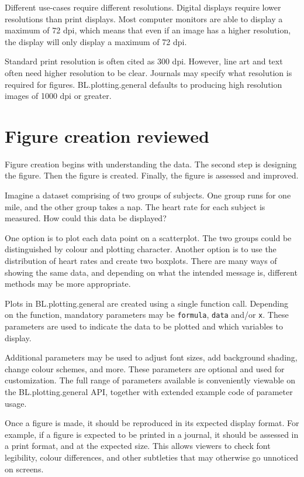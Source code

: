 \documentclass[letterpaper]{report}\usepackage[]{graphicx}\usepackage[]{color}
\begin{document}
Different use-cases require different resolutions. Digital displays require lower resolutions than print displays. Most computer monitors are able to display a maximum of 72 dpi, which means that even if an image has a higher resolution, the display will only display a maximum of 72 dpi. 

Standard print resolution is often cited as 300 dpi. However, line art and text often need higher resolution to be clear. Journals may specify what resolution is required for figures. BL.plotting.general defaults to producing high resolution images of 1000 dpi or greater.

\section{Figure creation reviewed}
Figure creation begins with understanding the data. The second step is designing the figure. Then the figure is created. Finally, the figure is assessed and improved.

Imagine a dataset comprising of two groups of subjects. One group runs for one mile, and the other group takes a nap. The heart rate for each subject is measured. How could this data be displayed? 

One option is to plot each data point on a scatterplot. The two groups could be distinguished by colour and plotting character. Another option is to use the distribution of heart rates and create two boxplots. There are many ways of showing the same data, and depending on what the intended message is, different methods may be more appropriate.

Plots in BL.plotting.general are created using a single function call. Depending on the function, mandatory parameters may be \verb|formula|, \verb|data| and/or \verb|x|. These parameters are used to indicate the data to be plotted and which variables to display.

Additional parameters may be used to adjust font sizes, add background shading, change colour schemes, and more. These parameters are optional and used for customization. The full range of parameters available is conveniently viewable on the BL.plotting.general API, together with extended example code of parameter usage.

Once a figure is made, it should be reproduced in its expected display format. For example, if a figure is expected to be printed in a journal, it should be assessed in a print format, and at the expected size. This allows viewers to check font legibility, colour differences, and other subtleties that may otherwise go unnoticed on screens.
\end{document}
